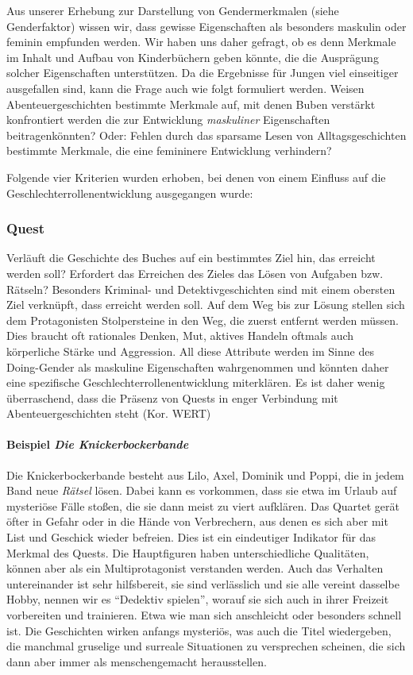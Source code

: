 Aus unserer Erhebung zur Darstellung von Gendermerkmalen (siehe
Genderfaktor) wissen wir, dass gewisse Eigenschaften als besonders
maskulin oder feminin empfunden werden. Wir haben uns daher gefragt, ob
es denn Merkmale im Inhalt und Aufbau von Kinderbüchern geben könnte,
die die Ausprägung solcher Eigenschaften unterstützen. Da die Ergebnisse
für Jungen viel einseitiger ausgefallen sind, kann die Frage auch wie
folgt formuliert werden. Weisen Abenteuergeschichten bestimmte Merkmale
auf, mit denen Buben verstärkt konfrontiert werden die zur Entwicklung
\emph{maskuliner} Eigenschaften beitragenkönnten? Oder: Fehlen durch das
sparsame Lesen von Alltagsgeschichten bestimmte Merkmale, die eine
femininere Entwicklung verhindern?

Folgende vier Kriterien wurden erhoben, bei denen von einem Einfluss auf
die Geschlechterrollenentwicklung ausgegangen wurde:

\subsubsection{Quest}

Verläuft die Geschichte des Buches auf ein bestimmtes Ziel hin, das
erreicht werden soll? Erfordert das Erreichen des Zieles das Lösen von
Aufgaben bzw. Rätseln? Besonders Kriminal- und Detektivgeschichten sind
mit einem obersten Ziel verknüpft, dass erreicht werden soll. Auf dem
Weg bis zur Lösung stellen sich dem Protagonisten Stolpersteine in den
Weg, die zuerst entfernt werden müssen. Dies braucht oft rationales
Denken, Mut, aktives Handeln oftmals auch körperliche Stärke und
Aggression. All diese Attribute werden im Sinne des Doing-Gender als
maskuline Eigenschaften wahrgenommen und könnten daher eine spezifische
Geschlechterrollenentwicklung miterklären. Es ist daher wenig
überraschend, dass die Präsenz von Quests in enger Verbindung mit
Abenteuergeschichten steht (Kor. WERT)

\paragraph{Beispiel \emph{Die Knickerbockerbande}}

Die Knickerbockerbande besteht aus Lilo, Axel, Dominik und Poppi, die in
jedem Band neue \emph{Rätsel} lösen. Dabei kann es vorkommen, dass sie
etwa im Urlaub auf mysteriöse Fälle stoßen, die sie dann meist zu viert
aufklären. Das Quartet gerät öfter in Gefahr oder in die Hände von
Verbrechern, aus denen es sich aber mit List und Geschick wieder
befreien. Dies ist ein eindeutiger Indikator für das Merkmal des Quests.
Die Hauptfiguren haben unterschiedliche Qualitäten, können aber als ein
Multiprotagonist verstanden werden. Auch das Verhalten untereinander ist
sehr hilfsbereit, sie sind verlässlich und sie alle vereint dasselbe
Hobby, nennen wir es ``Dedektiv spielen'', worauf sie sich auch in ihrer
Freizeit vorbereiten und trainieren. Etwa wie man sich anschleicht oder
besonders schnell ist. Die Geschichten wirken anfangs mysteriös, was
auch die Titel wiedergeben, die manchmal gruselige und surreale
Situationen zu versprechen scheinen, die sich dann aber immer als
menschengemacht herausstellen.

